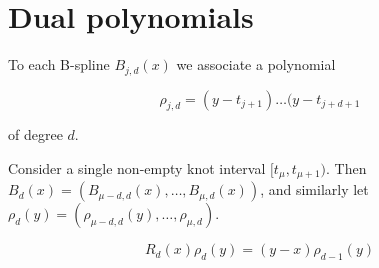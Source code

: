 \section{Dual polynomials}

To each B-spline $B_{j,d}(x)$ we associate a polynomial

\begin{equation}
\rho_{j,d} = (y - t_{j + 1})\ldots (y - t_{j + d + 1}
\end{equation}

of degree $d$.

Consider a single non-empty knot interval $[t_\mu, t_{\mu + 1})$.
Then $B_d(x) = (B_{\mu - d, d}(x),\ldots, B_{\mu,d}(x))$,
and similarly let $\rho_d(y) = (\rho_{\mu - d, d}(y),\ldots, \rho_{\mu, d})$.

\begin{lemma}
\begin{equation}
    R_d(x)\rho_d(y) = (y - x)\rho_{d - 1}(y)
\end{equation}
\end{lemma}

